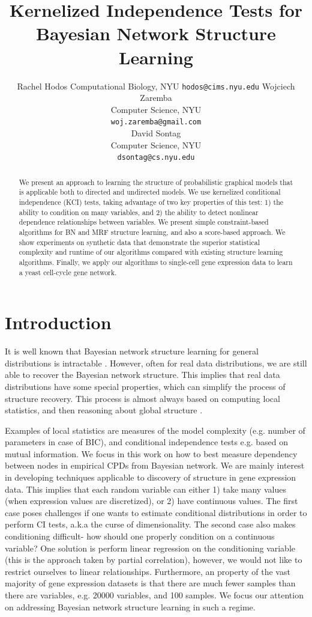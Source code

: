 \documentclass{article} %
\title{Kernelized Independence Tests for Bayesian Network Structure Learning}
\author{
Rachel Hodos
Computational Biology, NYU
\texttt{hodos@cims.nyu.edu}
\Xnd
Wojciech Zaremba \\
Computer Science, NYU \\
\texttt{woj.zaremba@gmail.com} \\
\XND
David Sontag \\
Computer Science, NYU \\
\texttt{dsontag@cs.nyu.edu} \\
}
\begin{document}
\maketitle

\begin{abstract}

We present an approach to learning the structure of probabilistic graphical models that is applicable both to directed and undirected models.  We use kernelized conditional independence (KCI) tests, taking advantage of two key properties of this test: 1) the ability to condition on many variables, and 2) the ability to detect nonlinear dependence relationships between variables.  We present simple constraint-based algorithms for BN and MRF structure learning, and also a score-based approach.  We show experiments on synthetic data that demonstrate the superior statistical complexity and runtime of our algorithms compared with existing structure learning algorithms.  Finally, we apply our algorithms to single-cell gene expression data to learn a yeast cell-cycle gene network.

\end{abstract}


\section{Introduction}
It is well known that Bayesian network structure learning for general distributions is 
intractable \cite{chickering1996learning}. However, often
for real data distributions, we are still able to 
recover the Bayesian network structure. This implies that real data
distributions have some special properties, which can simplify the process
of structure recovery.  This  process is almost always
based on computing local statistics, and then 
reasoning about global structure \cite{jaakkola2010learning, tsamardinos2006max}. 


Examples of local statistics are measures of the model complexity (e.g. number of parameters in case of BIC\cite{schwarz1978estimating}), and conditional independence tests e.g. based on mutual information.  We focus in this work on how to best measure dependency between nodes
in empirical CPDs from Bayesian network. We are mainly interest
in developing techniques applicable to discovery of structure
in gene expression data. This implies that each random variable
can either 1) take many values (when expression values are discretized), or 2) have continuous
values. The first case poses challenges if one wants to estimate conditional distributions in order to perform CI tests, a.k.a the curse of dimensionality.  The second case also makes conditioning difficult- how should one properly condition on a continuous variable?  One solution is perform linear regression on the conditioning variable (this is the approach taken by partial correlation), however, we would not like to restrict ourselves to linear relationships.  Furthermore, an property of the vast majority of gene expression datasets is that there are much fewer samples than there are variables, e.g. 20000 variables, and 100 samples.   We focus our attention on addressing Bayesian network structure learning
in such a regime. 
\end{document}
